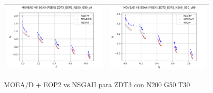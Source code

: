 \begin{figure}[H]
\begin{tabular}{c c}
    \includegraphics[scale=0.5]{figures/ZDT3_EOP2_N200_G50_T30/s9_comp.png} &
    \includegraphics[scale=0.5]{figures/ZDT3_EOP2_N200_G50_T30/s99_comp.png}\\
    \end{tabular}
    \caption{\centering MOEA/D + EOP2 vs NSGAII para ZDT3 con N200 G50 T30}
    \label{fig:7}
\end{figure}

